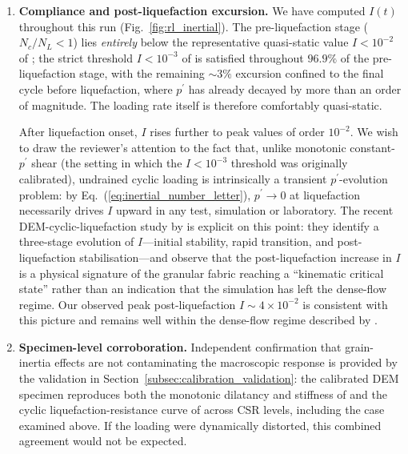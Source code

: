 \documentclass[11pt,a4paper]{article}
\begin{document}
\begin{enumerate}[leftmargin=*,label=(\arabic*),topsep=4pt,itemsep=6pt]
\item \textbf{Compliance and post-liquefaction excursion.}
We have computed $I(t)$ throughout this run
(Fig.~\ref{fig:rl_inertial}). The pre-liquefaction stage ($N_c/N_L<1$)
lies \emph{entirely} below the representative quasi-static value
$I<10^{-2}$ of \citet{daCruzEmam2005}; the strict threshold $I<10^{-3}$
of \citet{GDRMiDi2004} is satisfied throughout $96.9\%$ of the
pre-liquefaction stage, with the remaining $\sim 3\%$ excursion
confined to the final cycle before liquefaction, where $p^\prime$ has
already decayed by more than an order of magnitude. The loading rate
itself is therefore comfortably quasi-static.

After liquefaction onset, $I$ rises further to peak values of order
$10^{-2}$. We wish to draw the reviewer's attention to the fact that,
unlike monotonic constant-$p^\prime$ shear (the setting in which the
$I<10^{-3}$ threshold was originally calibrated), undrained cyclic
loading is intrinsically a transient $p^\prime$-evolution problem: by
Eq.~(\ref{eq:inertial_number_letter}), $p^\prime\to 0$ at liquefaction
necessarily drives $I$ upward in any test, simulation or laboratory.
The recent DEM-cyclic-liquefaction study by \citet{Wang2025inertial}
is explicit on this point: they identify a three-stage evolution of
$I$---initial stability, rapid transition, and post-liquefaction
stabilisation---and observe that the post-liquefaction increase in
$I$ is a physical signature of the granular fabric reaching a
``kinematic critical state'' rather than an indication that the
simulation has left the dense-flow regime. Our observed peak
post-liquefaction $I\sim 4\times 10^{-2}$ is consistent with this
picture and remains well within the dense-flow regime described by
\citet{daCruzEmam2005}.

\item \textbf{Specimen-level corroboration.}
Independent confirmation that grain-inertia effects are not
contaminating the macroscopic response is provided by the validation
in Section~\ref{subsec:calibration_validation}: the calibrated DEM
specimen reproduces both the monotonic dilatancy and stiffness of
\citet{Nakata1998} and the cyclic liquefaction-resistance curve of
\citet{Ishihara1985} across CSR levels, including the case examined
above. If the loading were dynamically distorted, this combined
agreement would not be expected.
\end{enumerate}
\end{document}
